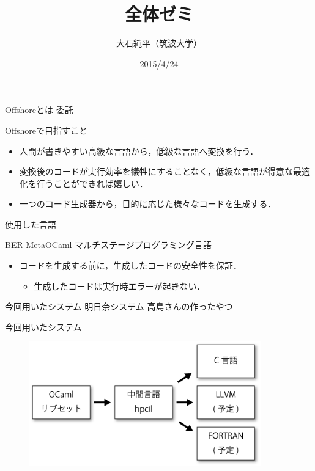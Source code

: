 \documentclass[14pt,dvipdfmx]{beamer}
\title{全体ゼミ}
\author{大石純平（筑波大学）}
\date{2015/4/24}
\institute{プログラム論理研究室}
\theoremstyle{definition}
\begin{document}
\maketitle

\begin{frame}{Offshoreとは}
  \center
  \Huge{委託}
\end{frame}

\begin{frame}{Offshoreで目指すこと}
  \center
  \large
  \begin{itemize}
  \item <1-> 人間が書きやすい高級な言語から，低級な言語へ変換を行う．
  \item <2-> 変換後のコードが実行効率を犠牲にすることなく，低級な言語が得意な最適化を行うことができれば嬉しい．
  \item <3> 一つのコード生成器から，目的に応じた様々なコードを生成する．
  \end{itemize}
\end{frame}

\begin{frame}{使用した言語}
  \center
  \large
  \begin{block}{BER MetaOCaml}
    マルチステージプログラミング言語
  \end{block}

  \normalsize
  \begin{itemize}
  \item <2-> コードを生成する前に，生成したコードの安全性を保証．
    \begin{itemize}
    \item <3> 生成したコードは実行時エラーが起きない．
    \end{itemize}
  \end{itemize}
\end{frame}
\begin{frame}{今回用いたシステム}
  \center
  \Huge
  明日奈システム
  \pause
  \center
  \normalsize
  高島さんの作ったやつ
\end{frame}

\begin{frame}{今回用いたシステム}
  \begin{figure}[ht]
    \centering
    \includegraphics[width=100mm]{./img/figure1.png}
  \end{figure}
\end{frame}
\end{document}
